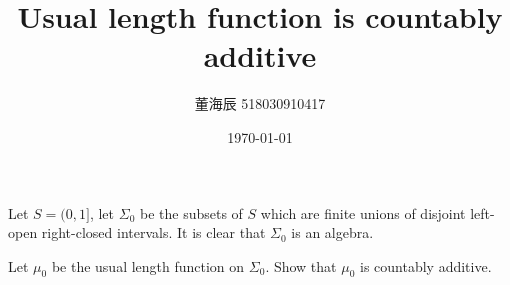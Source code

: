 
% 

\title{Usual length function is countably additive}
\date{\today}
\author{董海辰 518030910417}


\maketitle

\begin{thm}{}{}
    Let $S = (0, 1]$, let $\Sigma_0$ be the subsets of $S$ which are finite unions of disjoint left-open right-closed intervals. It is clear that $\Sigma_0$ is an algebra.

    Let $\mu_0$ be the usual length function on $\Sigma_0$. Show that $\mu_0$ is countably additive.
\end{thm}

